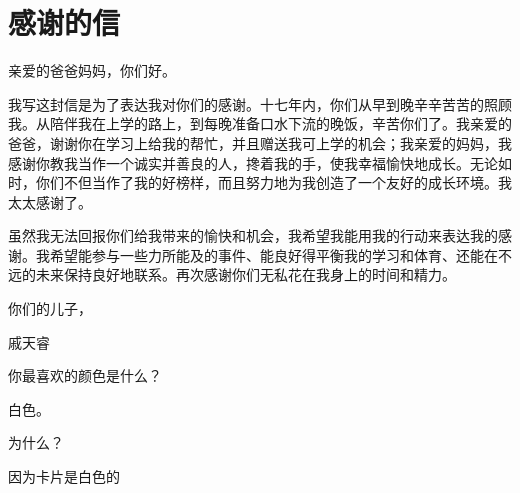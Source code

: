 \documentclass[a4paper,12pt]{article}
\begin{document}
\section{感谢的信}

亲爱的爸爸妈妈，你们好。

我写这封信是为了表达我对你们的感谢。十七年内，你们从早到晚辛辛苦苦的照顾我。从陪伴我在上学的路上，到每晚准备口水下流的晚饭，辛苦你们了。我亲爱的爸爸，谢谢你在学习上给我的帮忙，并且赠送我可上学的机会；我亲爱的妈妈，我感谢你教我当作一个诚实并善良的人，搀着我的手，使我幸福愉快地成长。无论如时，你们不但当作了我的好榜样，而且努力地为我创造了一个友好的成长环境。我太太感谢了。

虽然我无法回报你们给我带来的愉快和机会，我希望我能用我的行动来表达我的感谢。我希望能参与一些力所能及的事件、能良好得平衡我的学习和体育、还能在不远的未来保持良好地联系。再次感谢你们无私花在我身上的时间和精力。

你们的儿子，

戚天睿

你最喜欢的颜色是什么？

白色。

为什么？

因为卡片是白色的
\end{document}
